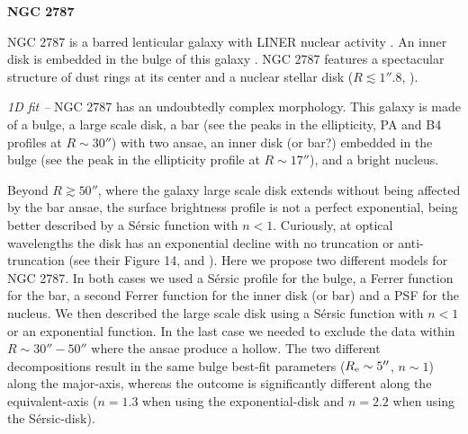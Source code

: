\documentclass[preprint2]{emulateapj}
\begin{document}
  \clearpage\newpage\noindent
  {\bf NGC 2787 \\}

  NGC 2787 is a barred lenticular galaxy with LINER nuclear activity \citep{veroncettyveron2006}.
  An inner disk is embedded in the bulge of this galaxy \citep{erwin2003n2787}.
  NGC 2787 features a spectacular structure of dust rings at its center \citep{erwinsparke2003}
  and a nuclear stellar disk ($R \lesssim 1''.8$, \citealt{ledo2010}).


  \emph{1D fit -- }
  NGC 2787 has an undoubtedly complex morphology. 
  This galaxy is made of a bulge, a large scale disk, a bar (see the peaks in the ellipticity, PA and B4 profiles
  at $R \sim 30''$) with two ansae, an inner disk (or bar?) embedded in the bulge (see the peak in the ellipticity profile
  at $R \sim 17''$), and a bright nucleus.

  Beyond $R \gtrsim 50''$, where the galaxy large scale disk extends without being affected by the bar ansae,
  the surface brightness profile is not a perfect exponential, being better described by a S\'ersic function
  with $n < 1$.
  Curiously, at optical wavelengths the disk has an exponential decline with no truncation or anti-truncation 
  (see \citealt{erwin2003n2787} their Figure 14, and \citealt{erwin2008}).
  Here we propose two different models for NGC 2787.
  In both cases we used a S\'ersic profile for the bulge, a Ferrer function for the bar, a second Ferrer function for the inner disk (or bar) 
  and a PSF for the nucleus. 
  We then described the large scale disk using a S\'ersic function with $n < 1$ 
  or an exponential function. 
  In the last case we needed to exclude the data within $R \sim 30'' - 50''$ where the ansae produce a hollow.
  The two different decompositions result in the same bulge best-fit parameters ($R_{\rm e} \sim 5''$, $n \sim 1$)
  along the major-axis, whereas the outcome is significantly different along the equivalent-axis 
  ($n = 1.3$ when using the exponential-disk and $n = 2.2$ when using the S\'ersic-disk).
\end{document}

